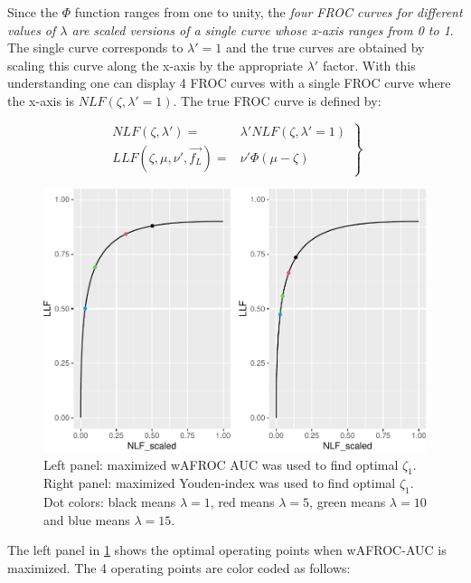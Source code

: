 \documentclass[
]{book}
\begin{document}
Since the \(\Phi\) function ranges from one to unity, the \emph{four FROC curves for different values of \(\lambda\) are scaled versions of a single curve whose x-axis ranges from 0 to 1}. The single curve corresponds to \(\lambda' = 1\) and the true curves are obtained by scaling this curve along the x-axis by the appropriate \(\lambda'\) factor. With this understanding one can display 4 FROC curves with a single FROC curve where the x-axis is \(NLF \left ( \zeta, \lambda' = 1 \right )\). The true FROC curve is defined by:

\begin{equation}
\left. 
\begin{aligned}
NLF \left ( \zeta, \lambda' \right ) =& \lambda' NLF \left ( \zeta, \lambda' = 1 \right ) \\
LLF\left ( \zeta, \mu, \nu', \overrightarrow{f_L} \right ) =& \nu' \Phi \left ( \mu - \zeta \right ) 
\end{aligned}
\right \}
\label{eq:rsm-froc-predictions2}
\end{equation}

\begin{figure}
\centering
\includegraphics{21-optim-op-point_files/figure-latex/optim-op-point-vary-lambda-1.pdf}
\caption{\label{fig:optim-op-point-vary-lambda}Left panel: maximized wAFROC AUC was used to find optimal \(\zeta_1\). Right panel: maximized Youden-index was used to find optimal \(\zeta_1\). Dot colors: black means \(\lambda = 1\), red means \(\lambda = 5\), green means \(\lambda = 10\) and blue means \(\lambda = 15\).}
\end{figure}

The left panel in \ref{fig:optim-op-point-vary-lambda} shows the optimal operating points when wAFROC-AUC is maximized. The 4 operating points are color coded as follows:
\end{document}
